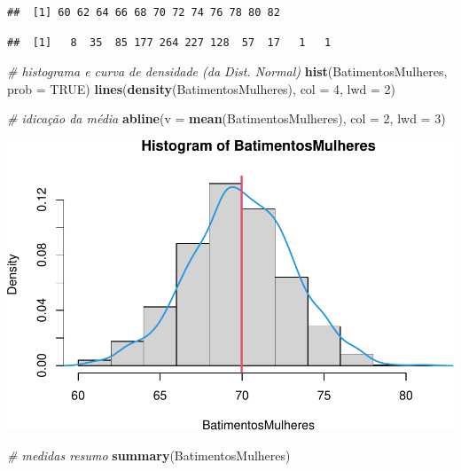 \documentclass[
]{book}
\newenvironment{Shaded}{\begin{snugshade}}{\end{snugshade}}
\newcommand{\AttributeTok}[1]{\textcolor[rgb]{0.13,0.29,0.53}{#1}}
\newcommand{\CommentTok}[1]{\textcolor[rgb]{0.56,0.35,0.01}{\textit{#1}}}
\newcommand{\ConstantTok}[1]{\textcolor[rgb]{0.56,0.35,0.01}{#1}}
\newcommand{\DecValTok}[1]{\textcolor[rgb]{0.00,0.00,0.81}{#1}}
\newcommand{\FunctionTok}[1]{\textcolor[rgb]{0.13,0.29,0.53}{\textbf{#1}}}
\newcommand{\NormalTok}[1]{#1}
\newcommand{\SpecialCharTok}[1]{\textcolor[rgb]{0.81,0.36,0.00}{\textbf{#1}}}
\begin{document}
\begin{verbatim}
##  [1] 60 62 64 66 68 70 72 74 76 78 80 82
\end{verbatim}

\begin{Shaded}
\end{Shaded}

\begin{verbatim}
##  [1]   8  35  85 177 264 227 128  57  17   1   1
\end{verbatim}

\begin{Shaded}
\begin{Highlighting}[]
\CommentTok{\# histograma e curva de densidade (da Dist. Normal)}
\FunctionTok{hist}\NormalTok{(BatimentosMulheres, }\AttributeTok{prob =} \ConstantTok{TRUE}\NormalTok{)}
\FunctionTok{lines}\NormalTok{(}\FunctionTok{density}\NormalTok{(BatimentosMulheres), }\AttributeTok{col =} \DecValTok{4}\NormalTok{, }\AttributeTok{lwd =} \DecValTok{2}\NormalTok{)}

\CommentTok{\# idicação da média}
\FunctionTok{abline}\NormalTok{(}\AttributeTok{v =} \FunctionTok{mean}\NormalTok{(BatimentosMulheres), }\AttributeTok{col =} \DecValTok{2}\NormalTok{, }\AttributeTok{lwd =} \DecValTok{3}\NormalTok{)}
\end{Highlighting}
\end{Shaded}

\includegraphics{Livro-Estatistica+R_files/figure-latex/unnamed-chunk-23-2.pdf}

\begin{Shaded}
\begin{Highlighting}[]
\CommentTok{\# medidas resumo}
\FunctionTok{summary}\NormalTok{(BatimentosMulheres)}
\end{Highlighting}
\end{Shaded}
\end{document}
